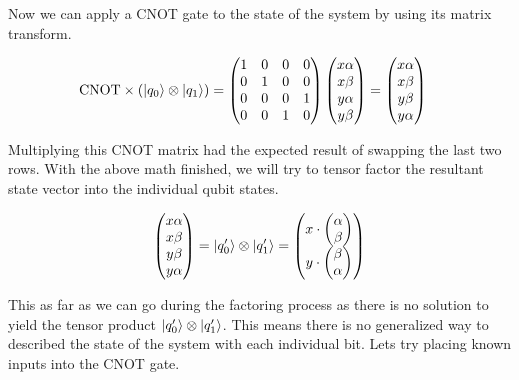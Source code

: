 \documentclass[conference]{IEEEtran}
\begin{document}
Now we can apply a CNOT gate to the state of the system by using its matrix transform.

\begin{align*}
\text{CNOT} \times (\ket{q_0} \otimes \ket{q_1}) &= \begin{pmatrix}
	1 & 0 & 0 & 0\\
	0 & 1 & 0 & 0\\
	0 & 0 & 0 & 1\\
	0 & 0 & 1 & 0
\end{pmatrix} \begin{pmatrix}x\alpha\\x\beta\\y\alpha\\y\beta\end{pmatrix} = \begin{pmatrix}x\alpha\\x\beta\\y\beta\\y\alpha\end{pmatrix}
\end{align*}

Multiplying this CNOT matrix had the expected result of swapping the last two rows. With the above math finished, we will try to tensor factor the resultant state vector into the individual qubit states.

\begin{align*}
\begin{pmatrix} x\alpha \\ x\beta \\ y\beta \\ y\alpha \end{pmatrix} &= \ket{q_0'} \otimes \ket{q_1'}
= \begin{pmatrix}
x \cdot \begin{pmatrix}\alpha\\\beta\end{pmatrix}\\
y \cdot \begin{pmatrix}\beta\\\alpha\end{pmatrix}
\end{pmatrix}\\
\end{align*}

This as far as we can go during the factoring process as there is no solution to yield the tensor product $\ket{q_0'} \otimes \ket{q_1'}$. This means there is no generalized way to described the state of the system with each individual bit. Lets try placing known inputs into the CNOT gate.
\end{document}
